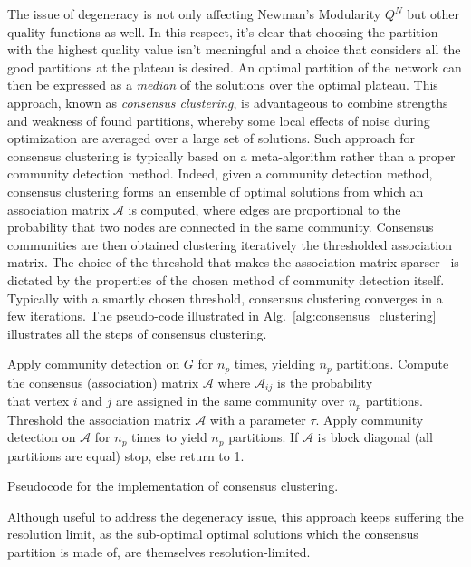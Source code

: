 The issue of degeneracy is not only affecting Newman's Modularity $Q^N$ but other quality functions as well.
In this respect, it's clear that choosing the partition with the highest quality value isn't meaningful and a choice that considers all the good partitions at the plateau is desired. 
An optimal partition of the network can then be expressed as a \emph{median} of the solutions over the optimal plateau.
This approach, known as \emph{consensus clustering}, is advantageous to combine strengths and weakness of found partitions, whereby some local effects of noise during optimization are averaged over a large set of solutions.
Such approach for consensus clustering is typically based on a meta-algorithm rather than a proper community detection method. Indeed, given a community detection method, consensus clustering forms an ensemble of optimal solutions from which an association matrix $\mathcal{A}$ is computed, where edges are proportional to the probability that two nodes are connected in the same community. 
Consensus communities are then obtained clustering iteratively the thresholded association matrix. The choice of the threshold that makes the association matrix sparser~\cite{lancichinetti2012} is dictated by the properties of the chosen method of community detection itself. Typically with a smartly chosen threshold, consensus clustering converges in a few iterations. The pseudo-code illustrated in Alg.~\ref{alg:consensus_clustering} illustrates all the steps of consensus clustering.

\begin{Algorithm}[htb!]
\begin{codebox}
\li Apply community detection on $G$ for $n_p$ times, yielding $n_p$ partitions.
\li Compute the consensus (association) matrix $\mathcal{A}$ where $\mathcal{A}_{ij}$ is the probability \\that vertex $i$ and $j$ are assigned in the same community over $n_p$ partitions.
\li Threshold the association matrix $\mathcal{A}$ with a parameter $\tau$.
\li Apply community detection on $\mathcal{A}$ for $n_p$ times to yield $n_p$ partitions.
\li If $\mathcal{A}$ is block diagonal (all partitions are equal) stop, else return to 1.
\end{codebox}
\caption{Pseudocode for the implementation of consensus clustering.}
\label{alg:consensus_clustering}
\end{Algorithm}

Although useful to address the degeneracy issue, this approach keeps suffering the resolution limit, as the sub-optimal optimal solutions which the consensus partition is made of, are themselves resolution-limited.

